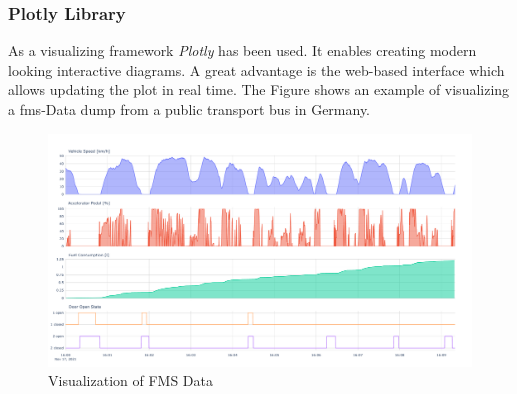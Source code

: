 \subsubsection{Plotly Library}
As a visualizing framework \textit{Plotly} has been used. It enables creating modern looking interactive diagrams. A great advantage is the web-based interface which allows updating the plot in real time. The Figure shows an example of visualizing a \acrshort{fms}-Data dump from a public transport bus in Germany.

\begin{figure}[h!]
	\centering
	\hfuzz=15.0pt
	\includegraphics[width=\textwidth]{images/FMS_Data_Visualization.pdf}
	\caption{Visualization of FMS Data}
	\label{fig:fms_visualization}
\end{figure}
\newpage
